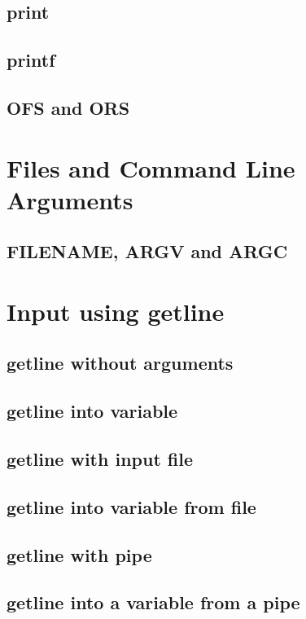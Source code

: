 \subsection{print}

\subsection{printf}

\subsection{OFS and ORS}

\section{Files and Command Line Arguments}

\subsection{FILENAME, ARGV and ARGC}

\section{Input using getline}

\subsection{getline without arguments}

\subsection{getline into variable}

\subsection{getline with input file}

\subsection{getline into variable from file}

\subsection{getline with pipe}

\subsection{getline into a variable from a pipe}

